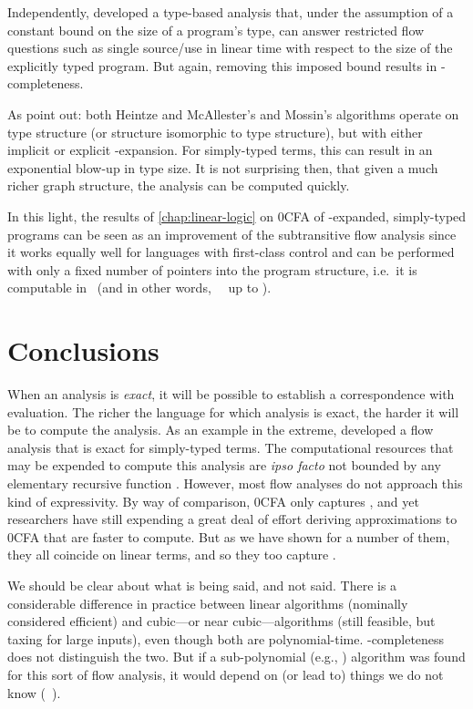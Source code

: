 Independently, \citet{mossin-njc98} developed a type-based analysis
that, under the assumption of a constant bound on the size of a
program's type, can answer restricted flow questions such as single
source/use in linear time with respect to the size of the explicitly
typed program.  But again, removing this imposed bound results in
\ptime-completeness.

As \citet{hankin-games} point out: both Heintze and McAllester's and
Mossin's algorithms operate on type structure (or structure isomorphic
to type structure), but with either implicit or explicit
-expansion.  For simply-typed terms, this can result in an
exponential blow-up in type size.  It is not surprising then, that
given a much richer graph structure, the analysis can be computed
quickly.  

In this light, the results of \autoref{chap:linear-logic} on 0CFA of
-expanded, simply-typed programs can be seen as an improvement
of the subtransitive flow analysis since it works equally well for
languages with first-class control and can be performed with only a
fixed number of pointers into the program structure, i.e.~it is
computable in \logspace\ (and in other words, \ptime\  \logspace\
up to ).










\section{Conclusions}

When an analysis is {\em exact}, it will be possible to establish a
correspondence with evaluation.  The richer the language for which
analysis is exact, the harder it will be to compute the analysis.  As
an example in the extreme, \citet{mossin-sas97} developed a flow
analysis that is exact for simply-typed terms.  The computational
resources that may be expended to compute this analysis are {\em ipso
facto} not bounded by any elementary recursive function
\cite{statman79}.  However, most flow analyses do not approach this kind
of expressivity.  By way of comparison, 0CFA only captures \ptime, and
yet researchers have still expending a great deal of effort deriving
approximations to 0CFA that are faster to compute.  But as we have
shown for a number of them, they all coincide on linear terms, and so
they too capture \ptime.

We should be clear about what is being said, and not said.  There is a
considerable difference in practice between linear algorithms
(nominally considered efficient) and cubic---or near
cubic---algorithms (still feasible, but taxing for large inputs), even
though both are polynomial-time.  \ptime-completeness does not
distinguish the two.  But if a sub-polynomial (e.g., \logspace)
algorithm was found for this sort of flow analysis, it would depend on
(or lead to) things we do not know (\logspace\  \ptime).  

